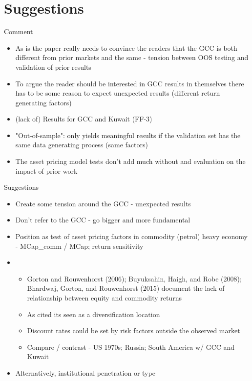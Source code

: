 \documentclass[xcolor=table]{beamer}
\begin{document}
\section{Suggestions}

\begin{frame}{Comment}
\begin{itemize}[<+->]
	\item As is the paper really needs to convince the readers that the GCC is both different from prior markets and the same - tension between OOS testing and validation of prior results
	\item To argue the reader should be interested in GCC results in themselves there has to be some reason to expect unexpected results (different return generating factors)
	\item (lack of) Results for GCC and Kuwait (FF-3)
	\item "Out-of-sample": only yields meaningful results if the validation set has the same data generating process (same factors)
	\item The asset pricing model tests don't add much without and evaluation on the impact of prior work
\end{itemize}
\end{frame}

\begin{frame}{Suggestions}
	\begin{itemize}[<+->]
	\item Create some tension around the GCC - unexpected results
	\item Don't refer to the GCC - go bigger and more fundamental
	\item Position as test of asset pricing factors in commodity (petrol) heavy economy - MCap\_comm / MCap; return sensitivity
	\item \begin{itemize}
		\item Gorton and Rouwenhorst (2006); Buyuksahin, Haigh, and Robe (2008); Bhardwaj, Gorton, and Rouwenhorst (2015) document the lack of relationship between equity and commodity returns
		\item As cited its seen as a diversification location
		\item Discount rates could be set by risk factors outside the observed market
		\item Compare / contrast - US 1970s; Russia; South America w/ GCC and Kuwait
	\end{itemize} 
	\item Alternatively, institutional penetration or type
\end{itemize}
\end{frame}
\end{document}
